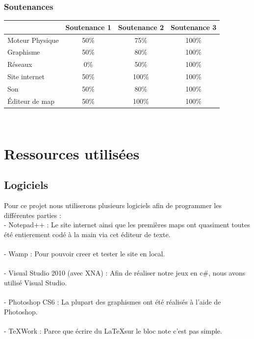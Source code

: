 \documentclass [11pt]{report}
\begin{document}
		\subsection{Soutenances}
			\begin{tabular}{| l | * {3}{c|}}
				\hline
		 		& Soutenance 1 & Soutenance 2 & Soutenance 3 \\
				\hline
				Moteur Physique & 50\% & 75\% & 100\% \\
				\hline
				 Graphisme & 50\% & 80\% & 100\% \\
				\hline
				Réseaux & 0\% & 50\% & 100\% \\
				\hline
				Site internet & 50\% & 100\%  & 100\%  \\
	          			 \hline
				Son & 50\% & 80\% & 100\% \\
				\hline
				\'Editeur de map & 50\% & 100\% & 100\% \\
				\hline
			\end{tabular}\\\vspace{4mm}


\chapter {Ressources utilisées}
	\section {Logiciels}

	Pour ce projet nous utiliserons plusieurs logiciels afin de programmer les différentes parties :\\

	- Notepad++ : Le site internet ainsi que les premières maps ont quasiment toutes été entierement codé à la main via cet éditeur de texte.\\\\\indent
	- Wamp : Pour pouvoir creer et tester le site en local.\\\\\indent
	- Visual Studio 2010 (avec XNA) : Afin de réaliser notre jeux en c\#, nous avons utilisé Visual Studio.\\\\\indent
	- Photoshop CS6 : La plupart des graphismes ont été réalisés à l'aide de Photoshop.\\\\\indent
	- TeXWork : Parce que écrire du \LaTeX sur le bloc note c'est pas simple.\\\vspace{10mm}
\end{document}
